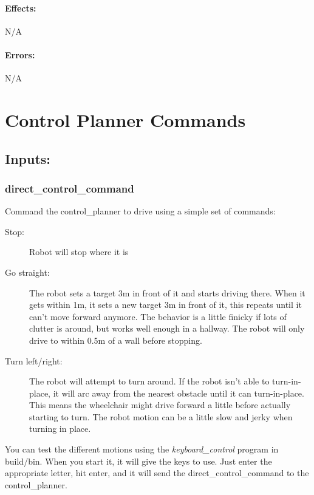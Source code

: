 \documentclass{article}
\begin{document}
\paragraph{Effects:}
N/A

\paragraph{Errors:}
N/A

\section{Control Planner Commands}

\subsection{Inputs:}

\subsubsection{direct\_control\_command}

Command the control\_planner to drive using a simple set of commands:

\begin{description}
  \item[Stop:] Robot will stop where it is
  \item[Go straight:] The robot sets a target 3m in front of it and starts driving there. When it gets within 1m, it 
sets a new target 3m in front of it, this repeats until it can't move forward anymore. The behavior is a little finicky 
if lots of clutter is around, but works well enough in a hallway. The robot will only drive to within 0.5m of a wall 
before stopping.
  \item[Turn left/right:] The robot will attempt to turn around. If the robot isn't able to turn-in-place, it will arc 
away from the nearest obstacle until it can turn-in-place. This means the wheelchair might drive forward a little before 
actually starting to turn. The robot motion can be a little slow and jerky when turning in place.
\end{description}


You can test the different motions using the \emph{keyboard\_control} program in build/bin. When you start it, it will 
give the keys to use. Just enter the appropriate letter, hit enter, and it will send the direct\_control\_command to 
the control\_planner.
\end{document}
